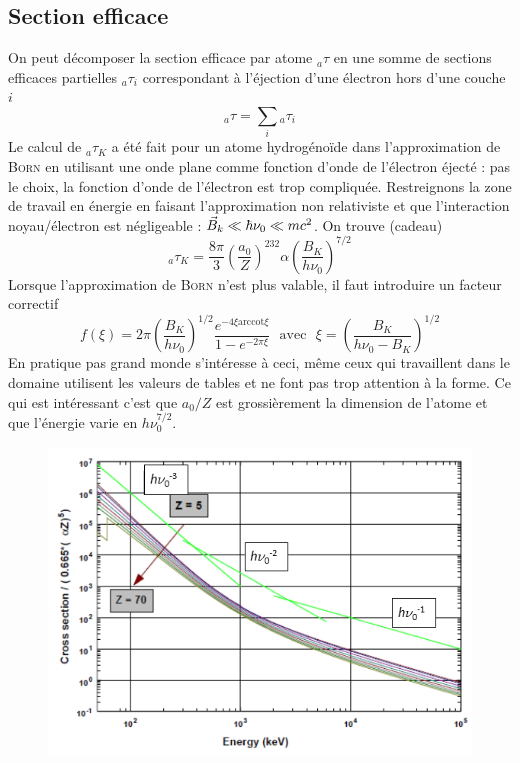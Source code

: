 \subsection{Section efficace}%
On peut décomposer la section efficace par atome $_a\tau$ en une somme de sections efficaces 
partielles $_a\tau_i$ correspondant à l'éjection d'une électron hors d'une couche $i$
\begin{equation}
_a\tau=\sum_i {}_a\tau_i
\end{equation}	
Le calcul de $_a\tau_K$ a été fait pour un atome hydrogénoïde dans 	l'approximation de \textsc{Born}
en utilisant une onde plane comme fonction d'onde de l'électron éjecté : pas le choix, la fonction
d'onde de l'électron est trop compliquée. Restreignons la zone de travail en énergie en faisant
l'approximation non relativiste et que l'interaction noyau/électron est négligeable : $\vec B_k\ll 
\hbar\nu_0\ll mc^2$. On trouve (cadeau)
\begin{equation}
_a\tau_K=\frac{8\pi}{3}\left(\frac{a_0}{Z}\right)^232\alpha\left(\frac{B_K}{h\nu_0}\right)^{7/2}
\end{equation}
Lorsque l'approximation de \textsc{Born} n'est plus valable, il faut introduire un facteur correctif
\begin{equation}
f(\xi)=2\pi\left(\frac{B_K}{h\nu_0}\right)^{1/2}\frac{e^{-4\xi \text{arccot}{\xi}}}{1-e^{-2\pi \xi}}\mbox{~~avec~~}\xi=\left(\frac{B_K}{h\nu_0-B_K}\right)^{1/2}
\end{equation}
En pratique pas grand monde s'intéresse à ceci, même ceux qui travaillent dans le domaine 
utilisent les valeurs de tables et ne font pas trop attention à la forme. Ce qui est intéressant
c'est que $a_0/Z$ est grossièrement la dimension de l'atome et que l'énergie varie en 
$h\nu_0^{7/2}$.\\


	\begin{figure}
	\vspace{-5mm}
	\includegraphics[scale=0.5]{ch4/image9}
	\end{figure}
	
